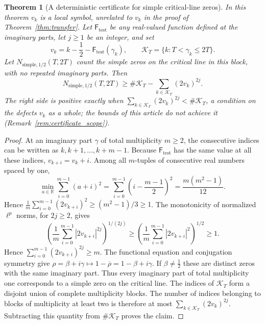 \documentclass[11pt,a4paper]{article}
\makeatletter
\numberwithin{equation}{section}
\DeclareRobustCommand{\CGref}[1]{\ref{#1}}
\let\CG@origref\ref
\newcommand{\CG@gettip}[1]{\@ifundefined{CGTip@#1}{#1}{\csname CGTip@#1\endcsname}}
\DeclareRobustCommand{\CGref}[1]{\pdftooltip{\CG@origref{#1}}{\CG@gettip{#1}}}
\newtheorem{theorem}{Theorem}[section]
\theoremstyle{definition}
\theoremstyle{remark}
\makeatother
\begin{document}
\begin{theorem}[A deterministic certificate for simple critical-line zeros]\label{thm:recovered_simple_certificate}
In this theorem $v_k$ is a local symbol, unrelated to $v_k$ in the proof of Theorem~\CGref{thm:transfer}. Let $\mathsf F_{\mathrm{test}}$ be any real-valued function defined at the imaginary parts,
let $j\ge1$ be an integer, and set
\begin{equation}
v_k=k-\frac12-\mathsf F_{\mathrm{test}}(\gamma_k),\qquad
\mathcal K_T=\{k:T<\gamma_k\le2T\}.
\label{eq:disp_46}
\end{equation}
Let $N_{\mathrm{simple},1/2}(T,2T)$ count the simple zeros on the
critical line in this block, with no repeated imaginary parts. Then
\begin{equation}
N_{\mathrm{simple},1/2}(T,2T)
\ge\#\mathcal K_T-\sum_{k\in\mathcal K_T}(2v_k)^{2j}.
\label{eq:recovered_simple_certificate}
\end{equation}
The right side is positive exactly when $\sum_{k\in\mathcal K_T}(2v_k)^{2j}<\#\mathcal K_T$, a condition on the defects $v_k$ as a whole; the bounds of this article do not achieve it (Remark~\CGref{rem:certificate_scope}).
\end{theorem}
\begin{proof}
At an imaginary part $\gamma$ of total multiplicity $m\ge2$, the consecutive
indices can be written as $k,k+1,\ldots,k+m-1$. Because $\mathsf F_{\mathrm{test}}$ has the
same value at all these indices, $v_{k+i}=v_k+i$.
Among all $m$-tuples of consecutive real numbers spaced by one,
\begin{equation}
\min_{a\in\mathbb R}\sum_{i=0}^{m-1}(a+i)^2
=\sum_{i=0}^{m-1}\left(i-\frac{m-1}{2}\right)^2
=\frac{m(m^2-1)}{12}.
\label{eq:disp_47}
\end{equation}
Hence
$\frac1m\sum_{i=0}^{m-1}(2v_{k+i})^2\ge(m^2-1)/3\ge1$.
The monotonicity of normalized $\ell^p$ norms, for $2j\ge2$, gives
\begin{equation}
\left(\frac1m\sum_{i=0}^{m-1}|2v_{k+i}|^{2j}\right)^{1/(2j)}
\ge\left(\frac1m\sum_{i=0}^{m-1}|2v_{k+i}|^2\right)^{1/2}\ge1.
\label{eq:disp_48}
\end{equation}
Hence $\sum_{i=0}^{m-1}(2v_{k+i})^{2j}\ge m$.
The functional equation and conjugation symmetry give
$\rho=\beta+i\gamma\mapsto1-\overline\rho=1-\beta+i\gamma$.
If $\beta\ne\frac12$ these are distinct zeros with the same imaginary part.
Thus every imaginary part of total multiplicity one corresponds to a simple
zero on the critical line.
The indices of $\mathcal K_T$ form a disjoint union of complete
multiplicity blocks. The number of indices belonging to blocks of
multiplicity at least two is therefore at most
$\sum_{k\in\mathcal K_T}(2v_k)^{2j}$.
Subtracting this quantity from $\#\mathcal K_T$ proves the claim.
\end{proof}
\end{document}
